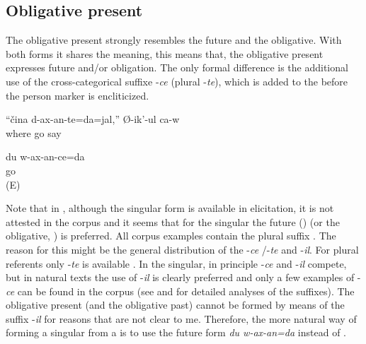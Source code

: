 \subsection{Obligative present}
\label{ssec:Obligative present}

The obligative present strongly resembles the future and the obligative. With both forms it shares the meaning, this means that, the obligative present expresses future and/or obligation. The only formal difference is the additional use of the cross-categorical suffixe -\textit{ce} (plural -\textit{te}), which is added to the  before the person marker is encliticized.
%
\begin{exe}
	\ex	\label{ex:‎Where will you (pl) go he says}
	\gll	``čina	d-ax-an-te=da=jal,''	Ø-ik'-ul	ca-w	\\
		where	go	say		\\
	\glt	{}

	\ex	\label{ex:I will go / have to go analytic}
	\gll	du	w-ax-an-ce=da\\
			go\\
	\glt	{} (E)
\end{exe}

Note that in , although the singular form  is available in elicitation, it is not attested in the corpus and it seems that for the singular the future () (or the obligative, ) is preferred. All corpus examples contain the plural suffix . The reason for this might be the general distribution of the  -\textit{ce} /-\textit{te} and -\textit{il}. For plural referents only -\textit{te} is available . In the singular, in principle -\textit{ce} and -\textit{il} compete, but in natural texts the use of -\textit{il} is clearly preferred and only a few examples of -\textit{ce} can be found in the corpus (see  and  for detailed analyses of the suffixes). The obligative present (and the obligative past) cannot be formed by means of the suffix -\textit{il} for reasons that are not clear to me. Therefore, the more natural way of forming a singular from a   is to use the future form \textit{du w-ax-an=da} instead of .


